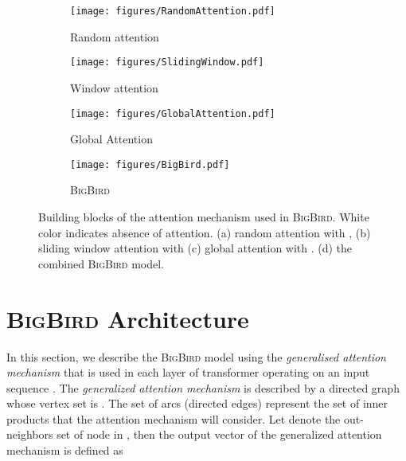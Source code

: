 \documentclass{article}
\newcommand{\bigb}{\textsc{BigBird}\xspace}
\begin{document}
 
\begin{figure}
    \vspace{-3mm}
    \centering
    \begin{subfigure}{.22\textwidth}
        \texttt{[image: figures/RandomAttention.pdf]}
        \caption{Random attention}
        \label{fig:rnd_atn}
    \end{subfigure}\hfill
    \begin{subfigure}{.22\textwidth}
        \texttt{[image: figures/SlidingWindow.pdf]}
        \caption{Window attention}
        \label{fig:wnd:atn}
    \end{subfigure}\hfill
    \begin{subfigure}{.22\textwidth}
        \texttt{[image: figures/GlobalAttention.pdf]}
        \caption{Global Attention}
        \label{fig:gbl_atn}
    \end{subfigure}\hfill
    \begin{subfigure}{.22\textwidth}
        \texttt{[image: figures/BigBird.pdf]}
        \caption{\bigb}
        \label{fig:bigb_atn}
    \end{subfigure}
    \hfill
    \caption{Building blocks of the attention mechanism used in \bigb. White color indicates absence of attention. (a) random attention with , (b) sliding window attention with  (c) global attention with . (d) the combined \bigb model.}
    \label{fig:my_label}
\end{figure}

\section{\bigb Architecture}
\label{sec:arch}
In this section, we describe the \bigb model using the \emph{generalised attention mechanism} that is used in each layer of transformer operating on an input sequence . 
The \emph{generalized attention mechanism} is described by a directed graph  whose vertex set is . 
The set of arcs (directed edges) represent the set of inner products that the attention mechanism will consider. 
Let  denote the out-neighbors set of node  in , then the  output vector of the generalized attention mechanism is defined as \useshortskip
\vspace{-1mm}
\end{document}
